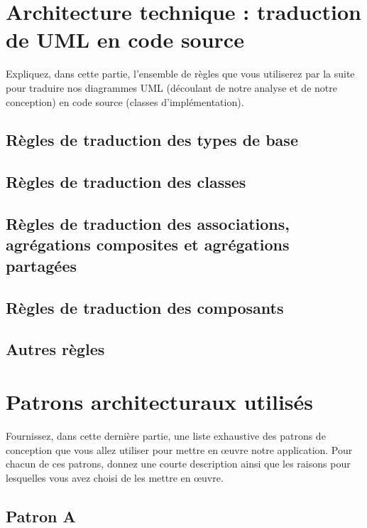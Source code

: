 \section{Architecture technique : traduction de UML en code source}
Expliquez, dans cette partie, l'ensemble de règles que vous utiliserez par la suite pour traduire nos diagrammes \textsc{UML} (découlant de notre analyse et de notre conception) en code source (classes d'implémentation).\\ 

\subsection{Règles de traduction des types de base}

\subsection{Règles de traduction des classes}

\subsection{Règles de traduction des associations, agrégations composites et agrégations partagées}

\subsection{Règles de traduction des composants}

\subsection{Autres règles}



\section{Patrons architecturaux utilisés}

Fournissez, dans cette dernière partie, une liste exhaustive des patrons de conception que vous allez utiliser pour mettre en œuvre notre application. 
Pour chacun de ces patrons, donnez une courte description ainsi que les raisons pour lesquelles vous avez choisi de les mettre en \oe uvre.\\


\subsection{Patron A}

